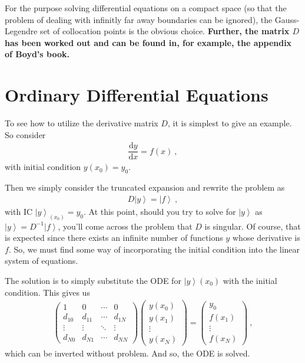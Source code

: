 \documentclass[11pt]{amsdtx}
\newcommand{\ud}{\mathrm{d}}
\newcommand{\ket}[1]{\left| #1 \right\rangle}
\begin{document}
For the purpose solving differential equations on a compact space (so that the problem of dealing with infinitly far away boundaries can be ignored), the Gauss-Legendre set of collocation points is the obvious choice.  \textbf{Further, the matrix $D$ has been worked out and can be found in, for example, the appendix of Boyd's book.}

\section{Ordinary Differential Equations}

To see how to utilize the derivative matrix $D$, it is simplest to give an example.  So consider
\begin{eqnarray}
	\dfrac{\ud y}{\ud x} = f(x)	~,
\end{eqnarray}
with initial condition $y(x_0) = y_0$.

Then we simply consider the truncated expansion and rewrite the problem as
\begin{eqnarray}
	D \ket{y} = \ket{f}~,
\end{eqnarray}
with IC $\ket{y}_{(x_0)} = y_0$.  At this point, should you try to solve for $\ket{y}$ as $\ket{y} = D^{-1}\ket{f}$, you'll come across the problem that $D$ is singular.  Of course, that is expected since there exists an infinite number of functions $y$ whose derivative is $f$.  So, we must find some way of incorporating the initial condition into the linear system of equations.  

The solution is to simply substitute the ODE for $\ket{y}(x_0)$ with the initial condition.  This gives us
\begin{eqnarray}
	\begin{pmatrix}
		1    & 0 & \cdots & 0 \\
		d_{10} & d_{11} & \cdots & d_{1N} \\
		\vdots & \vdots & \ddots & \vdots \\
		d_{N0} & d_{N1} & \cdots & d_{NN}
	\end{pmatrix}
	\begin{pmatrix}
		y(x_0) \\ y(x_1) \\ \vdots \\ y(x_N)
	\end{pmatrix}
	=
	\begin{pmatrix}
		y_0 \\ f(x_1) \\ \vdots \\ f(x_N)
	\end{pmatrix}~,
\end{eqnarray}
which can be inverted without problem.  And so, the ODE is solved.
\end{document}
